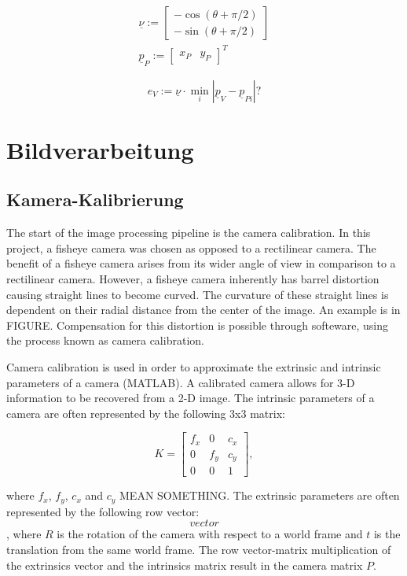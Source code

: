 \documentclass[arbeit=studie,oneside,BCOR=12mm]{ArbeitRST}
\begin{document}
\begin{gather}
  \underline{\nu} := 
  \begin{bmatrix}
    -\cos(\theta + \pi/2) \\
    -\sin(\theta + \pi/2)
  \end{bmatrix} \\
  \underline{p}_P := 
  \begin{bmatrix}
    x_P & y_P
  \end{bmatrix}^T
\end{gather}

\begin{equation}
  e_V :=  \underline{\nu} \cdot \min_i |\underline{p}_V -  \underline{p}_{Pi}| ?
  \label{eq:Querabweichung}
\end{equation}

\chapter{Bildverarbeitung} \section{Kamera-Kalibrierung} The start of the image
processing pipeline is the camera calibration. In this project, a fisheye
camera was chosen as opposed to a rectilinear camera. The benefit of a fisheye
camera arises from its wider angle of view in comparison to a rectilinear
camera. However, a fisheye camera inherently has barrel distortion causing
straight lines to become curved. The curvature of these straight lines is
dependent on their radial distance from the center of the image.  An example is
in FIGURE. Compensation for this distortion is possible through softeware,
using the process known as camera calibration. 

Camera calibration is used in order to approximate the extrinsic and intrinsic
parameters of a camera (MATLAB). A calibrated camera allows for 3-D information
to be recovered from a 2-D image. The intrinsic parameters of a camera are
often represented by the following 3x3 matrix:

\begin{equation}
  K = 
  \begin{bmatrix} 
    f_x & 0 & c_x\\ 
    0 & f_y & c_y\\
    0 & 0 & 1 
  \end{bmatrix},
\end{equation}


where $f_x$, $f_y$, $c_x$ and $c_y$ MEAN SOMETHING. The extrinsic
parameters are often represented by the following row vector:
$$vector$$, where $R$ is the rotation of the camera with respect to a world 
frame and $t$ is the translation from the same world frame. The row 
vector-matrix multiplication of the extrinsics vector and the intrinsics matrix
result in the camera matrix $P$.
\end{document}
